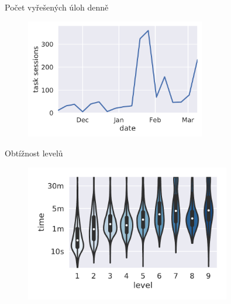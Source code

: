 \documentclass[
]{beamer}
\begin{document}
\begin{frame}{Počet vyřešených úloh denně}
\begin{figure}
\includegraphics[width=0.7\textwidth]{../img/daily-task-sessions}
\end{figure}
\end{frame}

\begin{frame}{Obtížnost levelů}
\begin{figure}
\includegraphics[width=0.8\textwidth]{../img/levels-time}
\end{figure}
\end{frame}
\end{document}
